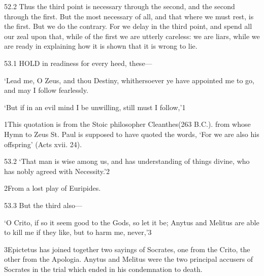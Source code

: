     52.2   Thus the third point is necessary through the second, and the second through the first. But the most necessary of all, and that where we must rest, is the first. But we do the contrary. For we delay in the third point, and spend all our zeal upon that, while of the first we are utterly careless: we are liars, while we are ready in explaining how it is shown that it is wrong to lie.

    53.1   HOLD in readiness for every heed, these—

    ‘Lead me, O Zeus, and thou Destiny, whithersoever ye have appointed me to go, and may I follow fearlessly.

    ‘But if in an evil mind I be unwilling, still must I follow,’1

    1This quotation is from the Stoic philosopher Cleanthes(263 B.C.). from whose Hymn to Zeus St. Paul is supposed to have quoted the words, ‘For we are also his offspring’ (Acts xvii. 24).

    53.2       ‘That man is wise among us, and has understanding of things divine, who has nobly agreed with Necessity.’2

    2From a lost play of Euripides.

    53.3   But the third also—

     ‘O Crito, if so it seem good to the Gods, so let it be; Anytus and Melitus are able to kill me if they like, but to harm me, never,’3

     3Epictetus has joined together two sayings of Socrates, one from the Crito, the other from the Apologia. Anytus and Melitus were the two principal accusers of Socrates in the trial which ended in his condemnation to death.
